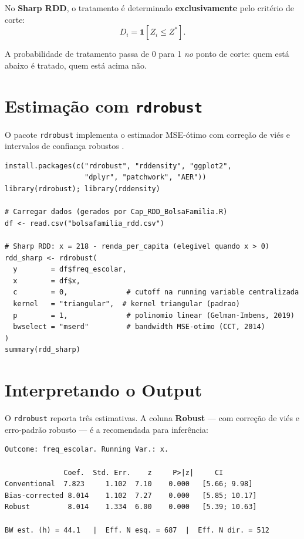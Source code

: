 \documentclass[12pt, a4paper, openany]{book}
\begin{document}
No \textbf{Sharp RDD}, o tratamento \'e determinado \textbf{exclusivamente} pelo crit\'erio de corte:
\begin{equation}
  D_i = \mathbf{1}[Z_i \leq Z^*].
\end{equation}

A probabilidade de tratamento passa de 0 para 1 \textit{no} ponto de corte: quem est\'a abaixo \'e tratado, quem est\'a acima n\~ao.

\section{Estima\c{c}\~ao com \texttt{rdrobust}}

O pacote \texttt{rdrobust} \citep{Calonico2015} implementa o estimador MSE-\'otimo com corre\c{c}\~ao de vi\'es e intervalos de confian\c{c}a robustos \citep{Calonico2014}.

\begin{lstlisting}[style=Rstyle]
install.packages(c("rdrobust", "rddensity", "ggplot2",
                   "dplyr", "patchwork", "AER"))
library(rdrobust); library(rddensity)

# Carregar dados (gerados por Cap_RDD_BolsaFamilia.R)
df <- read.csv("bolsafamilia_rdd.csv")

# Sharp RDD: x = 218 - renda_per_capita (elegivel quando x > 0)
rdd_sharp <- rdrobust(
  y        = df$freq_escolar,
  x        = df$x,
  c        = 0,              # cutoff na running variable centralizada
  kernel   = "triangular",  # kernel triangular (padrao)
  p        = 1,              # polinomio linear (Gelman-Imbens, 2019)
  bwselect = "mserd"         # bandwidth MSE-otimo (CCT, 2014)
)
summary(rdd_sharp)
\end{lstlisting}

\section{Interpretando o Output}

O \texttt{rdrobust} reporta tr\^es estimativas. A coluna \textbf{Robust} --- com corre\c{c}\~ao de vi\'es e erro-padr\~ao robusto --- \'e a recomendada para infer\^encia:

\begin{lstlisting}[style=Routput]
Outcome: freq_escolar. Running Var.: x.

              Coef.  Std. Err.    z     P>|z|     CI
Conventional  7.823     1.102  7.10    0.000   [5.66; 9.98]
Bias-corrected 8.014    1.102  7.27    0.000   [5.85; 10.17]
Robust         8.014    1.334  6.00    0.000   [5.39; 10.63]

BW est. (h) = 44.1   |  Eff. N esq. = 687  |  Eff. N dir. = 512
\end{lstlisting}
\end{document}
